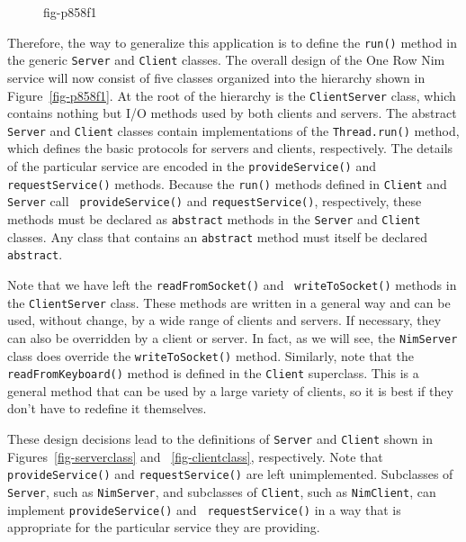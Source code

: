 {%
\begin{figure}[bt]
{fig-p858f1}
\end{figure}

Therefore, the way to generalize this application is to define the
{\tt run()} method in the generic {\tt Server} and {\tt Client}
classes. The overall design of the One Row Nim service will now consist of five classes
organized into the hierarchy shown in Figure~\ref{fig-p858f1}.  At
the root of the hierarchy is the {\tt ClientServer} class, which
contains nothing but I/O methods used by both clients and servers.
The abstract {\tt Server} and {\tt Client} classes contain
implementations of the {\tt Thread.run()} method, which defines the
basic protocols for servers and clients, respectively.   The details of the
particular service are encoded in the {\tt provideService()} and
{\tt requestService()} methods. Because the {\tt run()} methods defined 
in {\tt Client} and {\tt Server} call {\tt
provideService()} and {\tt requestService()}, respectively,  these
methods must be declared as {\tt abstract} methods in the {\tt Server}
and {\tt Client} classes.  Any class that contains an
\mbox{\tt abstract} method must itself be declared {\tt abstract}. 

Note that we have left the {\tt readFromSocket()} and {\tt
writeToSocket()} methods in the {\tt ClientServer} class. These
methods are written in a general way and can be used, without change,
by a wide range of clients and servers.  If necessary, they can also
be overridden by a client or server. In fact, as we will see, the
{\tt NimServer} class does override the {\tt writeToSocket()} method.
Similarly, note that the {\tt readFromKeyboard()} method is defined in
the {\tt Client} superclass.  This is a general method that
can be used by a large variety of clients, so it is best if they don't
have to redefine it themselves.

These design decisions lead to the definitions of {\tt Server} and
{\tt Client} shown in Figures~\ref{fig-serverclass} and
~\ref{fig-clientclass}, respectively. Note that {\tt provideService()}
and {\tt requestService()} are left unimplemented.  Subclasses of {\tt
Server}, such as {\tt NimServer}, and subclasses of {\tt Client}, such
as {\tt NimClient}, can implement {\tt provideService()} and {\tt
requestService()} in a way that is appropriate for the particular
service they are providing.

}
